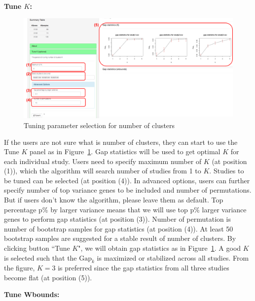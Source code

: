 \begin{steps}

\item \textbf{Tune $K$:} 

\begin{figure}[H]
\begin{center}
\includegraphics[scale=0.5]{./figure/metaClust/tuneK.pdf}
\caption{Tuning parameter selection for number of clusters}
\label{fig:metaClusttuneK}
\end{center}
\end{figure}

If the users are not sure what is number of clusters,
they can start to use the Tune $K$ panel as in Figure~\ref{fig:metaClusttuneK}.
Gap statistics will be used to get optimal $K$ for each individual study.
Users need to specify maximum number of $K$ (at position {\color{red} (1)}), which the algorithm will search number of studies from 1 to $K$.
Studies to be tuned can be selected (at position {\color{red} (4)}).
In advanced options, users can further specify number of top variance genes to be included and number of permutations.
But if users don't know the algorithm, please leave them as default.
Top percentage p\% by larger variance means that we will use top p\% larger variance genes to perform gap statistics (at position {\color{red} (3)}).
Number of permutation is number of bootstrap samples for gap statistics (at position {\color{red} (4)}).
At least 50 bootstrap samples are suggested for a stable result of number of clusters.
By clicking button ``Tune $K$",
we will obtain gap statistics as in Figure~\ref{fig:metaClusttuneK}.
A good $K$ is selected such that the $\mbox{Gap}_k$ is maximized or stabilized across all studies.
From the figure, $K=3$ is preferred since the gap statistics from all three studies become flat (at position {\color{red} (5)}).

\item \textbf{Tune Wbounds:} 


\end{steps}

